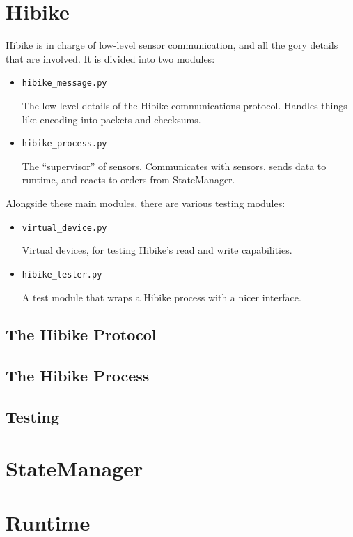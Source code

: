 \documentclass[12pt]{book}
\begin{document}
\chapter{Hibike}
Hibike is in charge of low-level sensor communication, and all the gory
details that are involved. It is divided into two modules:
\begin{itemize}
\item \begin{verbatim}hibike_message.py\end{verbatim}
The low-level details of the
Hibike communications protocol. Handles things like encoding into packets and checksums.
\item \begin{verbatim}hibike_process.py\end{verbatim}
The ``supervisor'' of sensors.
Communicates with sensors, sends data to runtime, and reacts to orders from StateManager.
\end{itemize}

Alongside these main modules, there are various testing modules:
\begin{itemize}
\item \begin{verbatim}virtual_device.py\end{verbatim}
Virtual devices, for testing Hibike's read and write capabilities.
\item \begin{verbatim}hibike_tester.py\end{verbatim}
A test module that wraps a Hibike process with a nicer interface.
\end{itemize}

\section{The Hibike Protocol}
\section{The Hibike Process}
\section{Testing}
\chapter{StateManager}
\chapter{Runtime}
\end{document}
